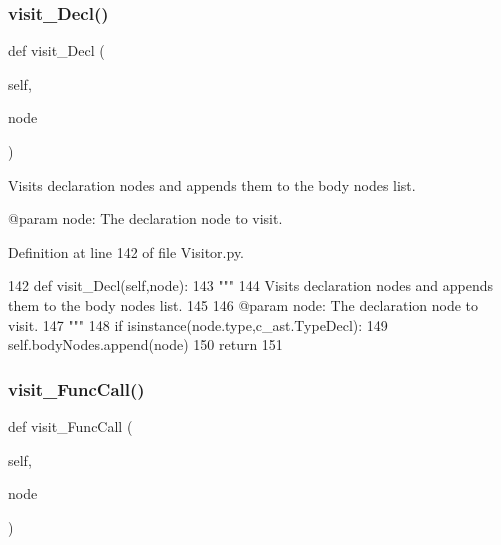 \subsubsection{\texorpdfstring{visit\+\_\+\+Decl()}{visit\_Decl()}}
{\footnotesize\ttfamily def visit\+\_\+\+Decl (\begin{DoxyParamCaption}\item[{}]{self,  }\item[{}]{node }\end{DoxyParamCaption})}

\begin{DoxyVerb}Visits declaration nodes and appends them to the body nodes list.

@param node: The declaration node to visit.
\end{DoxyVerb}
 

Definition at line 142 of file Visitor.\+py.


\begin{DoxyCode}
142     \textcolor{keyword}{def }visit\_Decl(self,node):
143         \textcolor{stringliteral}{"""
}
144 \textcolor{stringliteral}{        Visits declaration nodes and appends them to the body nodes list.
}
145 \textcolor{stringliteral}{
}
146 \textcolor{stringliteral}{        @param node: The declaration node to visit.
}
147 \textcolor{stringliteral}{        """}
148         \textcolor{keywordflow}{if} isinstance(node.type,c\_ast.TypeDecl):
149             self.bodyNodes.append(node)
150         \textcolor{keywordflow}{return}
151 
\end{DoxyCode}
\mbox{\label{classPostProcessor_1_1Visitor_1_1BinaryOpInRegHandler_a48e7baeee3968db14598ff72b6be63bd}} 
\subsubsection{\texorpdfstring{visit\+\_\+\+Func\+Call()}{visit\_FuncCall()}}
{\footnotesize\ttfamily def visit\+\_\+\+Func\+Call (\begin{DoxyParamCaption}\item[{}]{self,  }\item[{}]{node }\end{DoxyParamCaption})}

